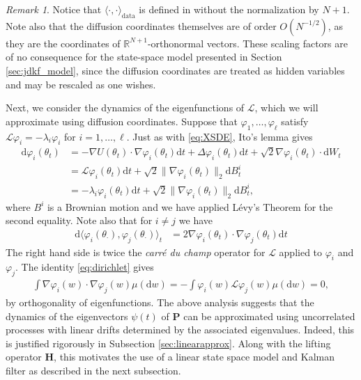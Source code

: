\documentclass[11pt]{article}
\theoremstyle{plain}
\theoremstyle{definition}
\theoremstyle{remark}
\newtheorem{remark}[theorem]{Remark}
\numberwithin{equation}{section}
\newcommand{\R}{\mathbb{R}}
\renewcommand{\L}{\mathscr{L}}
\renewcommand{\d}{\mathrm{d}}
\begin{document}
\begin{remark}\label{rmk:scaling}
Notice that $\langle \cdot,\cdot \rangle_{\text{data}}$ is defined in \citet{shnitzer2020diffusion} without the normalization by $N+1$. Note also that the diffusion coordinates themselves are of order $O(N^{-1/2})$, as they are the coordinates of $\R^{N+1}$-orthonormal vectors. These scaling factors are of no consequence for the state-space model presented in Section \ref{sec:jdkf_model}, since the diffusion coordinates are treated as hidden variables and may be rescaled as one wishes.
\end{remark}

Next, we consider the dynamics of the eigenfunctions of $\L$, which we will approximate using diffusion coordinates. Suppose that $\varphi_1,\dots,\varphi_\ell$ satisfy $\L \varphi_i=-\lambda_i \varphi_i$ for $i= 1,\dots,\ell$. Just as with \eqref{eq:XSDE}, Ito's lemma gives
\begin{equation}\label{eq:phiSDE}
\begin{aligned}
\d\varphi_i(\theta_t)&=-\nabla U(\theta_t)\cdot \nabla \varphi_i(\theta_t)\d t+\Delta\varphi_i(\theta_t) \d t+\sqrt{2}\nabla \varphi_i(\theta_t) \cdot \d W_t\\
&=\L \varphi_i (\theta_t)\d t+\sqrt{2}\|\nabla \varphi_i(\theta_t)\|_2 \d B^i_t\\
&=-\lambda_i \varphi_i(\theta_t)\d t+\sqrt{2}\|\nabla \varphi_i(\theta_t)\|_2 \d B^i_t,
\end{aligned}
\end{equation}
where $B^i$ is a Brownian motion and we have applied L\'{e}vy's Theorem for the second equality.
Note also that for $i\neq j$ we have
\begin{align*}
\d\langle\varphi_i(\theta_\cdot),\varphi_j(\theta_\cdot)\rangle _t&=2\nabla \varphi_i(\theta_t)\cdot\nabla\varphi_j(\theta_t) \d t
\end{align*}
The right hand side is twice the \emph{carr\'{e} du champ} operator for $\L$ applied to $\varphi_i$ and $\varphi_j$. The identity \eqref{eq:dirichlet} gives
\begin{align*}
\int \nabla \varphi_i(w)\cdot\nabla\varphi_j(w) \mu(\d w)=- \int \varphi_i(w) \L \varphi_j(w) \mu(\d w)=0,
\end{align*}
by orthogonality of eigenfunctions.
The above analysis suggests that the dynamics of the eigenvectors $\psi(t)$ of $\mathbf{P}$ can be approximated using uncorrelated processes with linear drifts determined by the associated eigenvalues. Indeed, this is justified rigorously in Subsection \ref{sec:linearapprox}. Along with the lifting operator $\mathbf{H}$, this motivates the use of a linear state space model and Kalman filter as described in the next subsection.
\end{document}

